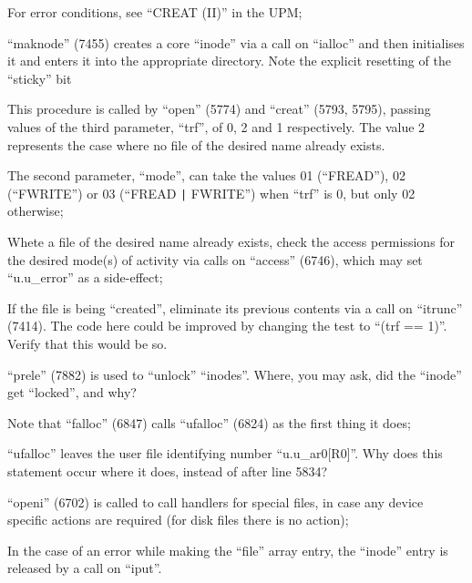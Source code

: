 \item[5788:] For error conditions, see ``CREAT
 (II)'' in the UPM;

\item[5790:] ``maknode'' (7455) creates a core
 ``inode'' via a call on ``ialloc''
 and then initialises it and
 enters it into the appropriate
 directory. Note the explicit
 resetting of the ``sticky'' bit
\ed



This procedure is called by ``open''
(5774) and ``creat'' (5793, 5795), passing values of the third parameter,
``trf'', of 0, 2 and 1 respectively. The
value 2 represents the case where no
file of the desired name already
exists.

\bd
\item[5812:] The second parameter, ``mode'', can
 take the values 01 (``FREAD''), 02
(``FWRITE'') or 03 (``FREAD \verb+|+ FWRITE'')
when ``trf'' is 0, but only 02 otherwise;

Whete a file of the desired name
already exists, check the access
permissions for the desired
mode(s) of activity via calls on
``access'' (6746), which may set
``u.u\_error'' as a side-effect;

\item[5824:] If the file is being ``created'',
 eliminate its previous contents
 via a call on ``itrunc'' (7414).
 The code here could be improved
 by changing the test to ``(trf ==
 1)''. Verify that this would be
 so.

\item[5826:] ``prele'' (7882) is used to
 ``unlock'' ``inodes''. Where, you
 may ask, did the ``inode'' get
 ``locked'', and why?

\item[5827:] Note that ``falloc'' (6847) calls
 ``ufalloc'' (6824) as the first
 thing it does;

\item[5831:] ``ufalloc'' leaves
 the user file
identifying number
``u.u\_ar0[R0]''. Why does this
statement occur where it does,
instead of after line 5834?

\item[5832:] ``openi'' (6702) is called to call
 handlers for special files, in
 case any device specific actions
 are required (for disk files
 there is no action);

\item[5839:] In the case of an error while
 making the ``file'' array entry,
 the ``inode'' entry is released by
 a call on ``iput''.
\ed

